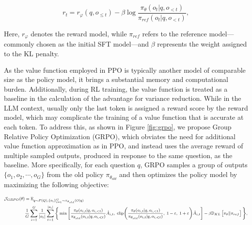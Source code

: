 \begin{itemize}[topsep=0pt]
\begin{itemize}[topsep=0pt]
\begin{equation}
    r_{t} = r_\varphi(q, o_{\le t}) - \beta \log\frac{\pi_{\theta}(o_{t}|q, o_{<t})}{\pi_{ref}(o_{t}|q, o_{<t})},
\label{eq:PPO-reward}
\end{equation}

Here, $r_\varphi$ denotes the reward model, while $\pi_{ref}$ refers to the reference model—commonly chosen as the initial SFT model—and $\beta$ represents the weight assigned to the KL penalty.

As the value function employed in PPO is typically another model of comparable size as the policy model, it brings a substantial memory and computational burden. Additionally, during RL training, the value function is treated as a baseline in the calculation of the advantage for variance reduction. While in the LLM context, usually only the last token is assigned a reward score by the reward model, which may complicate the training of a value function that is accurate at each token. To address this, as shown in Figure \ref{fig:grpo}, we propose Group Relative Policy Optimization (GRPO), which obviates the need for additional value function approximation as in PPO, and instead uses the average reward of multiple sampled outputs, produced in response to the same question, as the baseline. More specifically, for each question $q$, GRPO samples a group of outputs $\{o_1, o_2, \cdots, o_G\}$  from the old policy  $\pi_{\theta_{old}}$  and then optimizes the policy model by maximizing the following objective:

\begin{equation}
\footnotesize
\begin{split}
    \mathcal{J}_{GRPO}(\theta) &= \mathbb{E}_{q \sim P(Q), \{o_i\}_{i=1}^G \sim \pi_{\theta_{old}}(O|q)}  \\
    & \frac{1}{G}\sum_{i=1}^G\frac{1}{|o_i|} \sum_{t=1}^{|o_i|} \Bigg\{ \min \Bigg[ \frac{\pi_\theta(o_{i,t} | q, o_{i,<t})}{\pi_{\theta_{old}}(o_{i,t} | q, o_{i,<t})} \hat{A}_{i,t}, \; \text{clip} \Bigg( \frac{\pi_\theta(o_{i,t} | q, o_{i,<t})}{\pi_{\theta_{old}}(o_{i,t} | q, o_{i,<t})}, \; 1 - \varepsilon, \; 1 + \varepsilon \Bigg) \hat{A}_{i,t} \Bigg] - \beta \mathbb{D}_{KL}\left[\pi_{\theta} || \pi_{ref}\right] \Bigg\},
\end{split}
\label{eq:GRPO-obj}
\end{equation}


\end{itemize}
\end{itemize}
